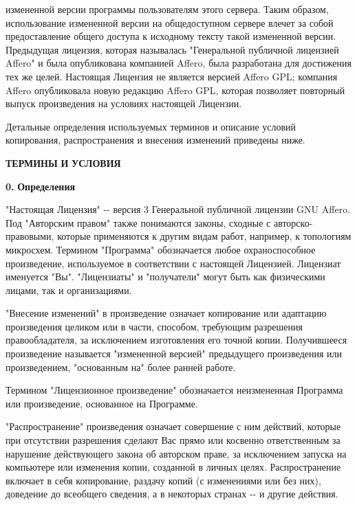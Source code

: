 измененной версии программы пользователям этого сервера. Таким образом, использование измененной версии на общедоступном сервере влечет за собой предоставление общего доступа к исходному тексту такой измененной версии. Предыдущая лицензия, которая называлась "{}Генеральной публичной лицензией Affero"{} и была опубликована компанией Affero, была разработана для достижения тех же целей. Настоящая Лицензия не является версией Affero GPL; компания Affero опубликовала новую редакцию Affero GPL, которая позволяет повторный выпуск произведения на условиях настоящей Лицензии.

Детальные определения используемых терминов и описание условий копирования, распространения и внесения изменений приведены ниже.

{\bfseries{ТЕРМИНЫ}} {\bfseries{И}} {\bfseries{УСЛОВИЯ}}

{\bfseries{0.}} {\bfseries{Определения}}

"{}Настоящая Лицензия"{} -\/-\/ версия 3 Генеральной публичной лицензии GNU Affero. Под "{}Авторским правом"{} также понимаются законы, сходные с авторско-\/правовыми, которые применяются к другим видам работ, например, к топологиям микросхем. Термином "{}Программа"{} обозначается любое охраноспособное произведение, используемое в соответствии с настоящей Лицензией. Лицензиат именуется "{}Вы"{}. "{}Лицензиаты"{} и "{}получатели"{} могут быть как физическими лицами, так и организациями.

"{}Внесение изменений"{} в произведение означает копирование или адаптацию произведения целиком или в части, способом, требующим разрешения правообладателя, за исключением изготовления его точной копии. Получившееся произведение называется "{}измененной версией"{} предыдущего произведения или произведением, "{}основанным на"{} более ранней работе.

Термином "{}Лицензионное произведение"{} обозначается неизмененная Программа или произведение, основанное на Программе.

"{}Распространение"{} произведения означает совершение с ним действий, которые при отсутствии разрешения сделают Вас прямо или косвенно ответственным за нарушение действующего закона об авторском праве, за исключением запуска на компьютере или изменения копии, созданной в личных целях. Распространение включает в себя копирование, раздачу копий (с изменениями или без них), доведение до всеобщего сведения, а в некоторых странах -\/-\/ и другие действия.

